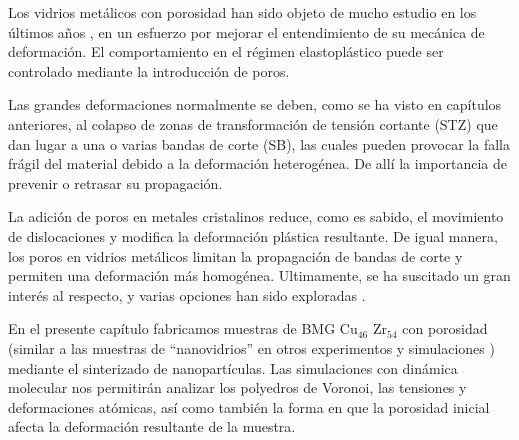 Los vidrios metálicos con porosidad han sido objeto de mucho estudio en los últimos años \citep{guan13,wang10}, en un esfuerzo
por mejorar el entendimiento de su mecánica de deformación. El comportamiento en el
régimen elastoplástico puede ser controlado mediante la introducción de poros.

Las grandes deformaciones normalmente se deben, como se ha visto en capítulos anteriores, al colapso de zonas de transformación de
tensión cortante (STZ) que dan lugar a una o varias bandas de corte (SB), las cuales pueden provocar la falla frágil del material debido a la
deformación heterogénea. De allí la importancia de prevenir o retrasar su propagación.

La adición de poros en metales cristalinos reduce, como es sabido, el movimiento de dislocaciones y modifica la
deformación plástica resultante. De igual manera, los poros en vidrios metálicos limitan la propagación de bandas de corte y permiten
una deformación más homogénea. Ultimamente, se ha suscitado un gran interés al respecto, y varias opciones han sido exploradas
\citep{guan13,wang10,schuh07,liontas14}.

En el presente capítulo fabricamos muestras de BMG Cu$_{46}$ Zr$_{54}$ con porosidad
(similar a las muestras de ``nanovidrios'' en otros experimentos y simulaciones \citep{adibi13,albe13}) mediante el sinterizado de nanopartículas.
Las simulaciones con dinámica molecular nos permitirán analizar los polyedros de Voronoi, las tensiones y deformaciones atómicas,
así como también la forma en que la porosidad inicial afecta la deformación resultante de la muestra.



